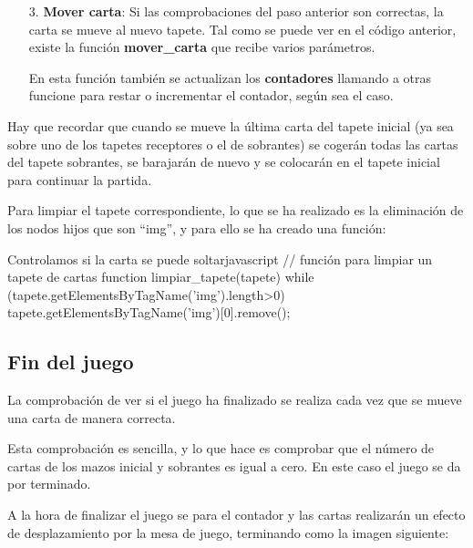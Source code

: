 \documentclass{\ClassPath/viu-tfm-template}
\begin{document}
\vspace{-1em}
\begin{enumerate}
    \item[3.] \textbf{Mover carta}: Si las comprobaciones del paso anterior son correctas, la carta se mueve al nuevo tapete. Tal como se puede ver en el código anterior, existe la función \textbf{mover\_carta} que recibe varios parámetros.

    En esta función también se actualizan los \textbf{contadores} llamando a otras funcione para restar o incrementar el contador, según sea el caso.
\end{enumerate}
\vspace{-1em}

Hay que recordar que cuando se mueve la última carta del tapete inicial (ya sea sobre uno de los tapetes receptores o el de sobrantes) se cogerán todas las cartas del tapete sobrantes, se barajarán de nuevo y se colocarán en el tapete inicial para continuar la partida.

Para limpiar el tapete correspondiente, lo que se ha realizado es la eliminación de los nodos hijos que son “img”, y para ello se ha creado una función:
\begin{mycode}{Controlamos si la carta se puede soltar}{javascript}{}
// función para limpiar un tapete de cartas
function limpiar_tapete(tapete) {
    while (tapete.getElementsByTagName('img').length>0) {
        tapete.getElementsByTagName('img')[0].remove();
    }
}
\end{mycode}



\subsection{Fin del juego}
La comprobación de ver si el juego ha finalizado se realiza cada vez que se mueve una carta de manera correcta.

Esta comprobación es sencilla, y lo que hace es comprobar que el número de cartas de los mazos inicial y sobrantes es igual a cero. En este caso el juego se da por terminado.

A la hora de finalizar el juego se para el contador y las cartas realizarán un efecto de desplazamiento por la mesa de juego, terminando como la imagen siguiente:
\end{document}
